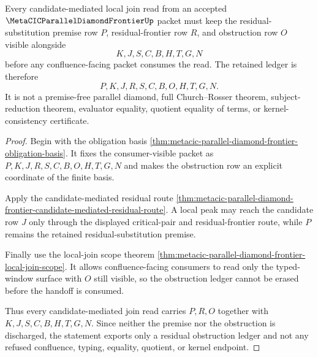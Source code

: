 \begin{theorem}
\label{thm:metacic-parallel-diamond-frontier-residual-obstruction-ledger}
Every candidate-mediated local join read from an accepted $\MetaCICParallelDiamondFrontierUp$ packet must keep the residual-substitution premise row $P$, residual-frontier row $R$, and obstruction row $O$ visible alongside
$$
K,J,S,C,B,H,T,G,N
$$
before any confluence-facing packet consumes the read. The retained ledger is therefore
$$
P,K,J,R,S,C,B,O,H,T,G,N .
$$
It is not a premise-free parallel diamond, full Church--Rosser theorem, subject-reduction theorem, evaluator equality, quotient equality of terms, or kernel-consistency certificate.
\end{theorem}
\begin{proof}
Begin with the obligation basis \autoref{thm:metacic-parallel-diamond-frontier-obligation-basis}. It fixes the consumer-visible packet as $P,K,J,R,S,C,B,O,H,T,G,N$ and makes the obstruction row an explicit coordinate of the finite basis.

Apply the candidate-mediated residual route \autoref{thm:metacic-parallel-diamond-frontier-candidate-mediated-residual-route}. A local peak may reach the candidate row $J$ only through the displayed critical-pair and residual-frontier route, while $P$ remains the retained residual-substitution premise.

Finally use the local-join scope theorem \autoref{thm:metacic-parallel-diamond-frontier-local-join-scope}. It allows confluence-facing consumers to read only the typed-window surface with $O$ still visible, so the obstruction ledger cannot be erased before the handoff is consumed.

Thus every candidate-mediated join read carries $P,R,O$ together with $K,J,S,C,B,H,T,G,N$. Since neither the premise nor the obstruction is discharged, the statement exports only a residual obstruction ledger and not any refused confluence, typing, equality, quotient, or kernel endpoint.
\end{proof}


